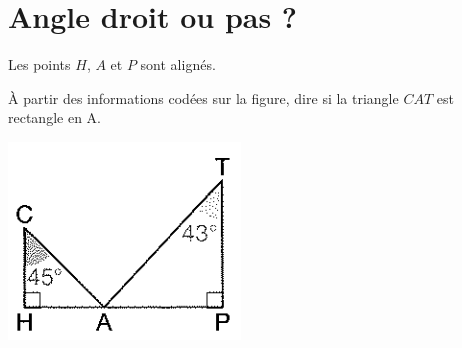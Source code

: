 \section{Angle droit ou pas ?}

\begin{multicols}{2}
	Les points $H$, $A$  et $P$ sont alignés.
	
	\begin{questions}
		\question \`A partir des informations codées sur la figure, dire si la triangle $CAT$ est rectangle en A.
	\end{questions}

	\begin{center}
		\includegraphics[scale=0.8]{img/fig}
	\end{center}
\end{multicols}